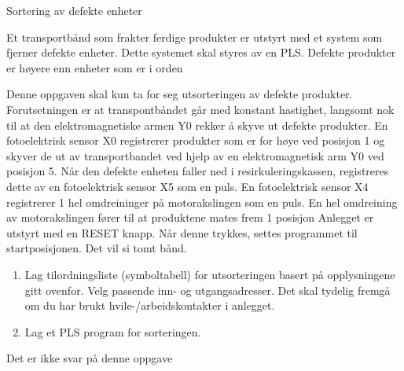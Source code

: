 

Sortering av defekte enheter 

Et transportbånd som frakter ferdige produkter er utstyrt med et system
som fjerner defekte enheter. Dette systemet skal styres av en PLS.
Defekte produkter er høyere enn enheter som er i orden


Denne oppgaven skal kun ta for seg utsorteringen av defekte produkter.
Forutsetningen er at transpontbåndet går med konstant hastighet, langsomt
nok til at den elektromagnetiske armen Y0 rekker å skyve ut defekte
produkter. En fotoelektrisk sensor X0 registrerer produkter som er
for høye ved posisjon 1 og skyver de ut av transportbandet ved hjelp
av en elektromagnetisk arm Y0 ved posisjon 5. Når den defekte enheten
faller ned i resirkuleringskassen, registreres dette av en fotoelektrisk
sensor X5 som en puls. En fotoelektrisk sensor X4 registrerer 1 hel
omdreininger på motorakslingen som en puls. En hel omdreining av motorakslingen
fører til at produktene mates frem 1 posisjon Anlegget er utstyrt
med en RESET knapp. Når denne trykkes, settes programmet til startposisjonen.
Det vil si tomt bånd. 
\begin{enumerate}
\item Lag tilordningsliste (symboltabell) for utsorteringen basert på opplysningene
gitt ovenfor. Velg passende inn- og utgangsadresser. Det skal tydelig
fremgå om du har brukt hvile-/arbeidskontakter i anlegget.
\item Lag et PLS program for sorteringen. 
\end{enumerate}







Det er ikke svar på denne oppgave












